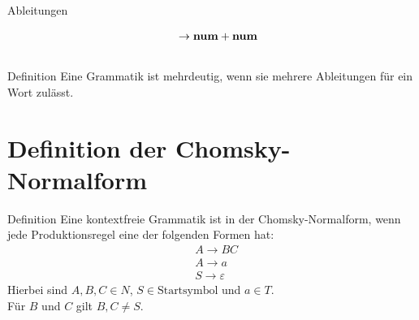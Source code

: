 \documentclass[t]{beamer}
\begin{document}
\begin{frame}
\begin{columns}[T]
\begin{column}{0.33\textwidth}
\begin{block}{Ableitungen}
\begin{minipage}[t][7.5cm]{\linewidth}
\begin{align*}
                            & \phantom{E} \rightarrow \bold{num} + \bold{num} \\
                        \end{align*}
                    \end{minipage}
                \end{block}
            \end{column}
        \end{columns}
        \bigskip
        \begin{block}{Definition\cite{softwarelanguage}}
            Eine Grammatik ist mehrdeutig, wenn sie mehrere Ableitungen für ein Wort zulässt.
        \end{block}
    \end{frame}


    \section{Definition der Chomsky-Normalform}\label{sec:chomsky-normal-form-definition}
    \begin{frame}
        \begin{block}{Definition\cite{watrous2020}}
            Eine kontextfreie Grammatik ist in der Chomsky-Normalform, wenn jede Produktionsregel eine der folgenden Formen hat:
            \begin{align*}
                & A \rightarrow BC \\
                & A \rightarrow a \\
                & S \rightarrow \varepsilon
            \end{align*}
            Hierbei sind $A,B,C \in N$, $S \in \text{Startsymbol}$ und $a \in T$. \\
            Für $B$ und $C$ gilt $B,C \neq S$.
        \end{block}
    \end{frame}
\end{document}
